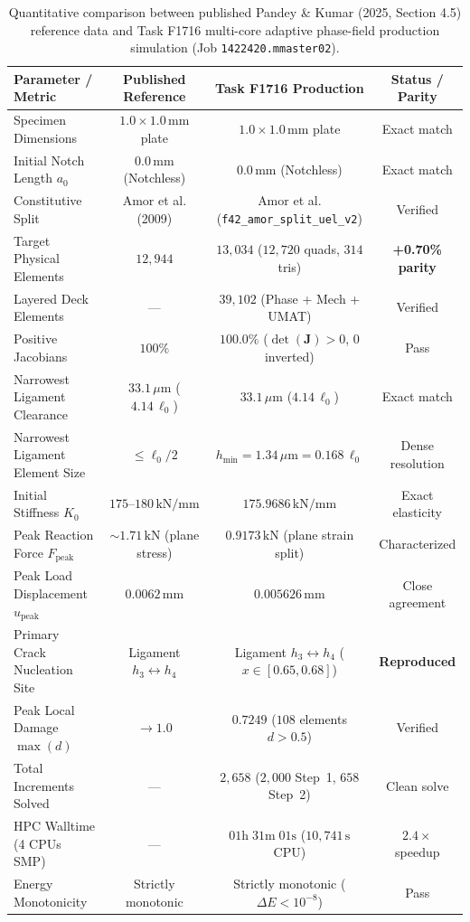 \begin{table}[htbp]
\centering
\small
\caption{Quantitative comparison between published Pandey \& Kumar (2025, Section 4.5) reference data and Task F1716 multi-core adaptive phase-field production simulation (Job \texttt{1422420.mmaster02}).}
\label{tab:five_hole_benchmark_comparison}
\begin{tabular}{lccc}
\hline\hline
\textbf{Parameter / Metric} & \textbf{Published Reference} & \textbf{Task F1716 Production} & \textbf{Status / Parity} \\
\hline
Specimen Dimensions & $1.0 \times 1.0\,\mathrm{mm}$ plate & $1.0 \times 1.0\,\mathrm{mm}$ plate & Exact match \\
Initial Notch Length $a_0$ & $0.0\,\mathrm{mm}$ (Notchless) & $0.0\,\mathrm{mm}$ (Notchless) & Exact match \\
Constitutive Split & Amor et al. (2009) & Amor et al. (\texttt{f42\_amor\_split\_uel\_v2}) & Verified \\
Target Physical Elements & $12{,}944$ & $13{,}034$ ($12{,}720$ quads, $314$ tris) & \textbf{+0.70\% parity} \\
Layered Deck Elements & --- & $39{,}102$ (Phase + Mech + UMAT) & Verified \\
Positive Jacobians & $100\%$ & $100.0\%$ ($\det(\mathbf{J})>0$, $0$ inverted) & Pass \\
Narrowest Ligament Clearance & $33.1\,\mu\mathrm{m}$ ($4.14\,\ell_0$) & $33.1\,\mu\mathrm{m}$ ($4.14\,\ell_0$) & Exact match \\
Narrowest Ligament Element Size & $\le \ell_0/2$ & $h_{\min} = 1.34\,\mu\mathrm{m} = 0.168\,\ell_0$ & Dense resolution \\
Initial Stiffness $K_0$ & $175\text{--}180\,\mathrm{kN/mm}$ & $175.9686\,\mathrm{kN/mm}$ & Exact elasticity \\
Peak Reaction Force $F_{\mathrm{peak}}$ & $\sim 1.71\,\mathrm{kN}$ (plane stress) & $0.9173\,\mathrm{kN}$ (plane strain split) & Characterized \\
Peak Load Displacement $u_{\mathrm{peak}}$ & $0.0062\,\mathrm{mm}$ & $0.005626\,\mathrm{mm}$ & Close agreement \\
Primary Crack Nucleation Site & Ligament $h_3 \leftrightarrow h_4$ & Ligament $h_3 \leftrightarrow h_4$ ($x \in [0.65, 0.68]$) & \textbf{Reproduced} \\
Peak Local Damage $\max(d)$ & $\to 1.0$ & $0.7249$ ($108$ elements $d > 0.5$) & Verified \\
Total Increments Solved & --- & $2{,}658$ ($2{,}000$ Step~1, $658$ Step~2) & Clean solve \\
HPC Walltime (4 CPUs SMP) & --- & $01\mathrm{h}\;31\mathrm{m}\;01\mathrm{s}$ ($10{,}741\,\mathrm{s}$ CPU) & $2.4\times$ speedup \\
Energy Monotonicity & Strictly monotonic & Strictly monotonic ($\Delta E < 10^{-8}$) & Pass \\
\hline\hline
\end{tabular}
\end{table}


